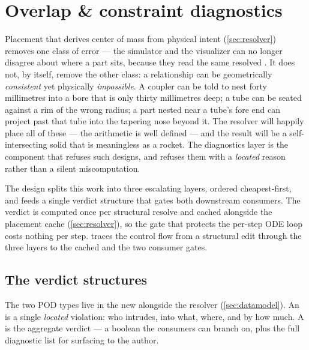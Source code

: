\section{Overlap \& constraint diagnostics}\label{sec:diagnostics}

Placement that derives center of mass from physical intent (\cref{sec:resolver}) removes one
class of error --- the simulator and the visualizer can no longer disagree about where a part
sits, because they read the same resolved . It does not, by itself, remove the
other class: a relationship can be geometrically \emph{consistent} yet physically
\emph{impossible}. A coupler can be told to nest forty millimetres into a bore that is only
thirty millimetres deep; a tube can be seated against a rim of the wrong radius; a part nested
near a tube's fore end can project past that tube into the tapering nose beyond it. The
resolver will happily place all of these --- the arithmetic is well defined --- and the result
will be a self-intersecting solid that is meaningless as a rocket. The diagnostics layer is the
component that refuses such designs, and refuses them with a \emph{located} reason rather than a
silent miscomputation.

The design splits this work into three escalating layers, ordered cheapest-first, and feeds a
single verdict structure that gates both downstream consumers. The verdict is computed once per
structural resolve and cached alongside the placement cache (\cref{sec:resolver}), so the gate
that protects the per-step ODE loop costs nothing per step.  traces the
control flow from a structural edit through the three layers to the cached 
and the two consumer gates.


\subsection{The verdict structures}

The two POD types live in the new  alongside the resolver
(\cref{sec:datamodel}). An  is a single \emph{located} violation: who
intrudes, into what, where, and by how much. A  is the aggregate verdict ---
a boolean the consumers can branch on, plus the full diagnostic list for surfacing to the
author.

